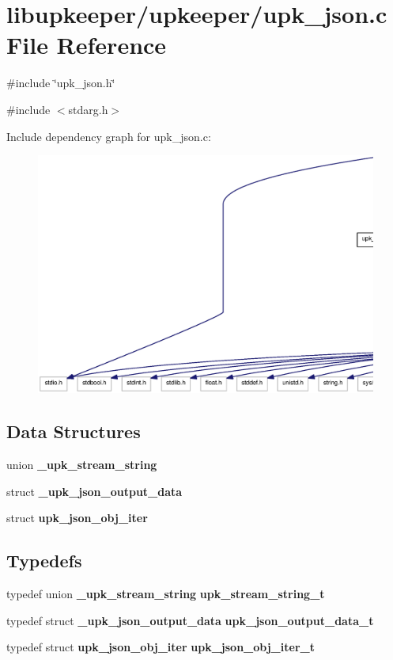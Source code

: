 \section{libupkeeper/upkeeper/upk\_\-json.c File Reference}
\label{upk__json_8c}
{\ttfamily \#include \char`\"{}upk\_\-json.h\char`\"{}}\par
{\ttfamily \#include $<$stdarg.h$>$}\par
Include dependency graph for upk\_\-json.c:
\nopagebreak
\begin{figure}[H]
\begin{center}
\leavevmode
\includegraphics[width=400pt]{upk__json_8c__incl}
\end{center}
\end{figure}
\subsection*{Data Structures}
\begin{DoxyCompactItemize}
\item 
union {\bf \_\-upk\_\-stream\_\-string}
\item 
struct {\bf \_\-upk\_\-json\_\-output\_\-data}
\item 
struct {\bf upk\_\-json\_\-obj\_\-iter}
\end{DoxyCompactItemize}
\subsection*{Typedefs}
\begin{DoxyCompactItemize}
\item 
typedef union {\bf \_\-upk\_\-stream\_\-string} {\bf upk\_\-stream\_\-string\_\-t}
\item 
typedef struct {\bf \_\-upk\_\-json\_\-output\_\-data} {\bf upk\_\-json\_\-output\_\-data\_\-t}
\item 
typedef struct {\bf upk\_\-json\_\-obj\_\-iter} {\bf upk\_\-json\_\-obj\_\-iter\_\-t}
\end{DoxyCompactItemize}

